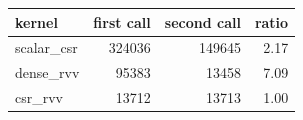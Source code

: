 \begin{tabular}{lrrr}
\toprule
kernel & first call & second call & ratio \\
\midrule
scalar\_csr & 324036 & 149645 & 2.17 \\
dense\_rvv & 95383 & 13458 & 7.09 \\
csr\_rvv & 13712 & 13713 & 1.00 \\
\bottomrule
\end{tabular}
